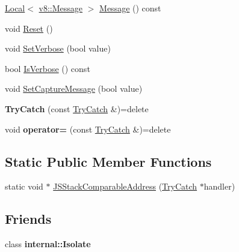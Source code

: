 \begin{DoxyCompactItemize}
\item 
\mbox{\hyperlink{classv8_1_1Local}{Local}}$<$ \mbox{\hyperlink{classv8_1_1Message}{v8\+::\+Message}} $>$ \mbox{\hyperlink{classv8_1_1TryCatch_a91a41367c87e7a59ada09bcb9aae76c0}{Message}} () const
\item 
void \mbox{\hyperlink{classv8_1_1TryCatch_a3aae8acab4c99b374b7d782763d4c8e1}{Reset}} ()
\item 
void \mbox{\hyperlink{classv8_1_1TryCatch_a032cd889d76bd596e2616df11ced8682}{Set\+Verbose}} (bool value)
\item 
bool \mbox{\hyperlink{classv8_1_1TryCatch_aa4e77abd0d6790700442153cb036517f}{Is\+Verbose}} () const
\item 
void \mbox{\hyperlink{classv8_1_1TryCatch_a541b8fa6951bd5a439692c22d5c7b73c}{Set\+Capture\+Message}} (bool value)
\item 
\mbox{\label{classv8_1_1TryCatch_a7368ba9d21e9bddef45a76f537f1900e}} 
{\bfseries Try\+Catch} (const \mbox{\hyperlink{classv8_1_1TryCatch}{Try\+Catch}} \&)=delete
\item 
\mbox{\label{classv8_1_1TryCatch_a9fec223509a6d7095b3088871a6084ce}} 
void {\bfseries operator=} (const \mbox{\hyperlink{classv8_1_1TryCatch}{Try\+Catch}} \&)=delete
\end{DoxyCompactItemize}
\subsection*{Static Public Member Functions}
\begin{DoxyCompactItemize}
\item 
static void $\ast$ \mbox{\hyperlink{classv8_1_1TryCatch_a164f5def2f8fa5deb6bcf06fb50fbff2}{J\+S\+Stack\+Comparable\+Address}} (\mbox{\hyperlink{classv8_1_1TryCatch}{Try\+Catch}} $\ast$handler)
\end{DoxyCompactItemize}
\subsection*{Friends}
\begin{DoxyCompactItemize}
\item 
\mbox{\label{classv8_1_1TryCatch_a438c8b784134d31d7a50bc60098d8ba1}} 
class {\bfseries internal\+::\+Isolate}
\end{DoxyCompactItemize}


